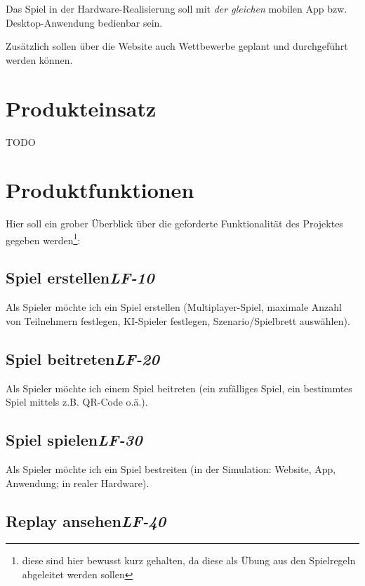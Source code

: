 Das Spiel in der Hardware-Realisierung soll mit \emph{der gleichen} mobilen App bzw. Desktop-Anwendung bedienbar sein.

Zusätzlich sollen über die Website auch Wettbewerbe geplant und durchgeführt werden können.


\chapter{Produkteinsatz}

TODO


\chapter{Produktfunktionen}

Hier soll ein grober Überblick über die geforderte Funktionalität des Projektes gegeben werden\footnote{diese sind hier bewusst kurz gehalten, da diese als Übung aus den Spielregeln abgeleitet werden sollen}:

\section[Spiel erstellen]{Spiel erstellen\hfill \emph{LF-10}}

Als Spieler möchte ich ein Spiel erstellen (Multiplayer-Spiel, maximale Anzahl von Teilnehmern festlegen, KI-Spieler festlegen, Szenario/Spielbrett auswählen).
    
\section[Spiel beitreten]{Spiel beitreten\hfill \emph{LF-20}}

Als Spieler möchte ich einem Spiel beitreten (ein zufälliges Spiel, ein bestimmtes Spiel mittels z.B. QR-Code o.ä.).
    
\section[Spiel spielen]{Spiel spielen\hfill \emph{LF-30}}

Als Spieler möchte ich ein Spiel bestreiten (in der Simulation: Website, App, Anwendung; in realer Hardware).

\section[Replay ansehen]{Replay ansehen\hfill \emph{LF-40}}

